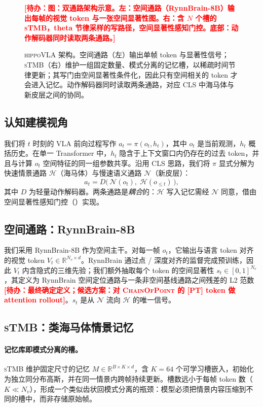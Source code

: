 \documentclass[10pt,letterpaper,fontset=fandol]{ctexart}
\newcommand{\todo}[1]{\textcolor{red}{\textbf{[待办：#1]}}}
\newcommand{\method}{\textsc{hippoVLA}\xspace}
\newcommand{\sTMB}{\textsc{sTMB}\xspace}
\begin{document}
\begin{figure}[t]
\centering
\todo{图：双通路架构示意。左：空间通路（RynnBrain-8B）输出每帧的视觉 token 与一张空间显著性图。右：含 $N$ 个槽的 \sTMB，theta 节律采样的写路径，空间显著性感知门控。底部：动作解码器同时读取两条通路。}
\caption{\method 架构。空间通路（左）输出单帧 token 与显著性信号；\sTMB（右）维护一组固定数量、模式分离的记忆槽，以稀疏时间节律更新；其写门由空间显著性条件化，因此只有空间相关的 token 才会进入记忆。动作解码器同时读取两条通路，对应 CLS 中海马体与新皮层之间的协同。}
\label{fig:arch}
\end{figure}

\subsection{认知建模视角}
\label{sec:framing}
我们将 $t$ 时刻的 VLA 前向过程写作 $a_t = \pi(o_t, h_t)$，其中 $o_t$ 是当前观测，$h_t$ 概括历史。在单一 Transformer 中，$h_t$ 隐含于上下文窗口内仍存在的过去 token，并且与计算 $o_t$ 空间特征的同一组参数共享。沿用 CLS 思路，我们将 $\pi$ 显式分解为快速情景通路 $\mathcal{H}$（海马体）与慢速语义通路 $\mathcal{N}$（新皮层）：
\begin{equation}
    a_t = D\bigl(\,\mathcal{N}(o_t),\; \mathcal{H}(o_{\le t})\,\bigr),
\end{equation}
其中 $D$ 为轻量动作解码器。两条通路是\emph{耦合}的：$\mathcal{H}$ 写入记忆需经 $\mathcal{N}$ 同意，借由空间显著性感知门控（）实现。

\subsection{空间通路：RynnBrain-8B}
\label{sec:spatial}
我们采用 RynnBrain-8B 作为空间主干。对每一帧 $o_t$，它输出与语言 token 对齐的视觉 token $V_t \in \mathbb{R}^{N_v \times d}$。RynnBrain 通过点 / 深度对齐的监督完成预训练，因此 $V_t$ 内含隐式的三维先验；我们额外抽取每个 token 的空间显著性 $s_t \in [0,1]^{N_v}$，其定义为 RynnBrain 空间定位通路与一条非空间基线通路之间残差的 L2 范数 \todo{最终确定定义；候选方案：对 \textsc{ChainOfPoint} 的 [PT] token 做 attention rollout}。$s_t$ 是从 $\mathcal{N}$ 流向 $\mathcal{H}$ 的唯一信号。

\subsection{\sTMB：类海马体情景记忆}
\label{sec:stmb}

\paragraph{记忆库即模式分离的槽。}
\sTMB 维护固定尺寸的记忆 $M \in \mathbb{R}^{B \times K \times d}$，含 $K=64$ 个可学习槽嵌入，初始化为独立同分布高斯，并在同一情景内跨帧持续更新。槽数远小于每帧 token 数（$K \ll N_v$），形成一个类似齿状回模式分离的瓶颈：模型必须把情景内容压缩到不同的槽中，而非存储原始帧。
\end{document}
